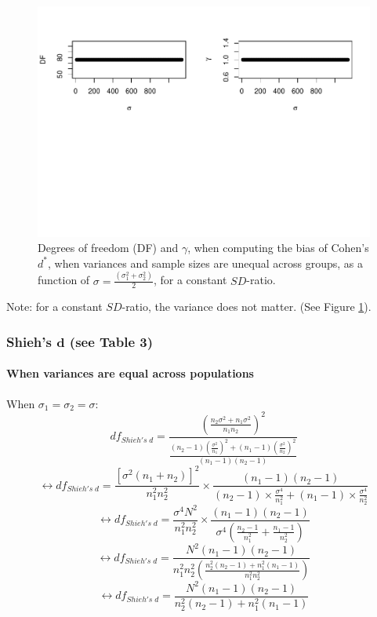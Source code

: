 \documentclass[
  english,
  man,mask]{apa6}
\let\oldparagraph\paragraph
\renewcommand{\paragraph}[1]{\oldparagraph{#1}\mbox{}}
\begin{document}
\begin{figure}
\centering
\includegraphics{Theoretical-Bias-of-all-estimators-as-a-function-of-population-parameters_files/figure-latex/biascohendprimehetunbalvariance2-1.pdf}
\caption{\label{fig:biascohendprimehetunbalvariance2}Degrees of freedom (DF) and \(\gamma\), when computing the bias of Cohen's \(d^*\), when variances and sample sizes are unequal across groups, as a function of \(\sigma= \frac{(\sigma_1^2+\sigma_2^2)}{2}\), for a constant \(SD\)-ratio.}
\end{figure}

Note: for a constant \(SD\)-ratio, the variance does not matter. (See Figure \ref{fig:biascohendprimehetunbalvariance2}).

\hypertarget{shiehs-bmd-see-table-3}{%
\subsubsection{\texorpdfstring{Shieh's \(\bm{d}\) (see Table 3)}{Shieh's \textbackslash bm\{d\} (see Table 3)}}\label{shiehs-bmd-see-table-3}}

\hypertarget{when-variances-are-equal-across-populations-1}{%
\paragraph{When variances are equal across populations}\label{when-variances-are-equal-across-populations-1}}

When \(\sigma_1=\sigma_2=\sigma\):
\[df_{Shieh's \; d} = \frac{\left( \frac{n_2\sigma^2+n_1\sigma^2}{n_1n_2}\right)^2}{\frac{(n_2-1)\left( \frac{\sigma^2}{n_1}\right)^2+(n_1-1)\left( \frac{\sigma^2}{n_2}\right)^2}{(n_1-1)(n_2-1)}}\]
\[\leftrightarrow df_{Shieh's \; d} = \frac{[\sigma^2(n_1+n_2)]^2}{n_1^2n_2^2} \times \frac{(n_1-1)(n_2-1)}{(n_2-1) \times  \frac{\sigma^4}{n_1^2}+(n_1-1) \times \frac{\sigma^4}{n_2^2}}\]
\[\leftrightarrow df_{Shieh's \; d} = \frac{\sigma^4N^2}{n_1^2n_2^2} \times \frac{(n_1-1)(n_2-1)}{\sigma^4 \left( \frac{n_2-1}{n^2_1}+\frac{n_1-1}{n^2_2}\right) }\]
\[\leftrightarrow df_{Shieh's \; d} = \frac{N^2(n_1-1)(n_2-1)}{n_1^2n_2^2 \left( \frac{n_2^2(n_2-1)+n_1^2(n_1-1)}{n_1^2n_2^2}\right)}\]
\[\leftrightarrow df_{Shieh's \; d} = \frac{N^2(n_1-1)(n_2-1)}{n_2^2(n_2-1)+n_1^2(n_1-1)}\]
\end{document}

